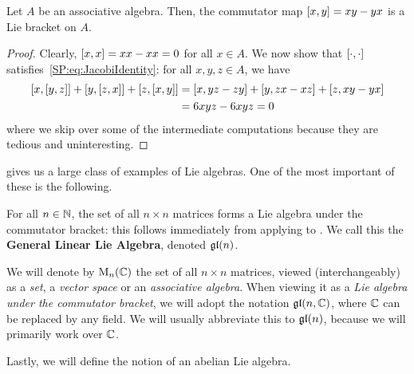 \begin{lemma}\label{Ch1:Lemma:CommBracket}
    Let $A$ be an associative algebra. Then, the commutator map $\left[ x, y \right] = xy - yx$ is a Lie bracket on $A$.
\end{lemma}
\begin{proof}  %
    Clearly, $\left[ x, x \right] = xx - xx = 0$ for all $x \in A$. We now show that $\left[ \cdot, \cdot \right]$ satisfies~\eqref{SP:eq:JacobiIdentity}: for all $x, y, z \in A$, we have
    \begin{align*}
        \brac{x, \brac{y, z}} + \brac{y, \brac{z, x}} + \brac{z, \brac{x, y}} &= \brac{x, yz - zy} + \brac{y, zx - xz} + \brac{z, xy - yx} \\
        &= %
        6xyz - 6xyz = 0
    \end{align*}
    where we skip over some of the intermediate computations because they are tedious and uninteresting.
\end{proof}

 gives us a large class of examples of Lie algebras. One of the most important of these is the following.

\begin{boxexample}\label{Ch1:Eg:gl}
    For all $n \in \mathbb{N}$, the set of all $n \times n$ matrices forms a Lie algebra under the commutator bracket: this follows immediately from applying  to . We call this the \textbf{General Linear Lie Algebra}, denoted $\mathfrak{gl}\!\left( n \right)$.
\end{boxexample}

\begin{boxconvention}
    We will denote by $\operatorname{M}_{n}\!\left( \mathbb{C} \right)$ the set of all $n \times n$ matrices, viewed (interchangeably) as a \textit{set}, a \textit{vector space} or an \textit{associative algebra}. When viewing it as a \textit{Lie algebra under the commutator bracket}, we will adopt the notation $\mathfrak{gl}\!\left( n, \mathbb{C} \right)$, where $\mathbb{C}$ can be replaced by any field. We will usually abbreviate this to $\mathfrak{gl}\!\left( n \right)$, because we will primarily work over $\mathbb{C}$.
\end{boxconvention}

Lastly, we will define the notion of an abelian Lie algebra.

